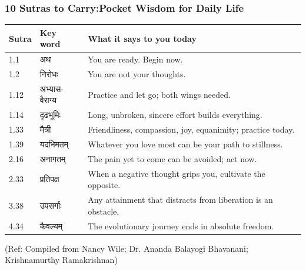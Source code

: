 \begin{frame}[fragile]\frametitle{10 Sutras to Carry:Pocket Wisdom for Daily Life}

\begin{center}
{\small
\begin{tabular}{|p{1cm}|p{1.5cm}|p{4.5cm}|}
\hline
\textbf{Sutra} & \textbf{Key word} & \textbf{What it says to you today} \\
\hline
1.1 & अथ & You are ready. Begin now. \\
1.2 & निरोधः & You are not your thoughts. \\
1.12 & अभ्यास-वैराग्य & Practice and let go; both wings needed. \\
1.14 & दृढभूमिः & Long, unbroken, sincere effort builds everything. \\
1.33 & मैत्री & Friendliness, compassion, joy, equanimity; practice today. \\
1.39 & यदभिमतम् & Whatever you love most can be your path to stillness. \\
2.16 & अनागतम् & The pain yet to come can be avoided; act now. \\
2.33 & प्रतिपक्ष & When a negative thought grips you, cultivate the opposite. \\
3.38 & उपसर्गाः & Any attainment that distracts from liberation is an obstacle. \\
4.34 & कैवल्यम् & The evolutionary journey ends in absolute freedom. \\
\hline
\end{tabular}
}
\end{center}

\tiny{(Ref: Compiled from Nancy Wile; Dr. Ananda Balayogi Bhavanani; Krishnamurthy Ramakrishnan)}

\end{frame}


